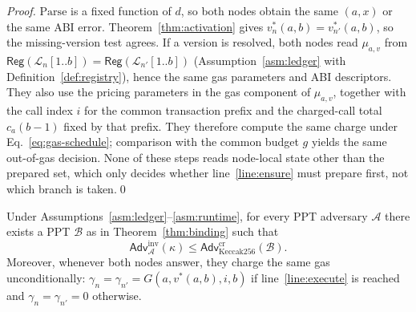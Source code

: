 \documentclass[runningheads]{llncs}
\begin{document}
\begin{proof}
$\mathrm{Parse}$ is a fixed function of $d$, so both nodes obtain the same $(a,x)$ or the same ABI error. Theorem~\ref{thm:activation} gives $v^{*}_{n}(a,b)=v^{*}_{n'}(a,b)$, so the missing-version test agrees. If a version is resolved, both nodes read $\mu_{a,v}$ from $\mathsf{Reg}(\mathcal{L}_n[1..b])=\mathsf{Reg}(\mathcal{L}_{n'}[1..b])$ (Assumption~\ref{asm:ledger} with Definition~\ref{def:registry}), hence the same gas parameters and ABI descriptors. They also use the pricing parameters in the gas component of $\mu_{a,v}$, together with the call index $i$ for the common transaction prefix and the charged-call total $c_{a}(b-1)$ fixed by that prefix. They therefore compute the same charge under Eq.~\eqref{eq:gas-schedule}; comparison with the common budget $g$ yields the same out-of-gas decision. None of these steps reads node-local state other than the prepared set, which only decides whether line~\ref{line:ensure} must prepare first, not which branch is taken.\qed
\end{proof}

\begin{theorem}
\label{thm:invocation}
Under Assumptions~\ref{asm:ledger}--\ref{asm:runtime}, for every PPT adversary $\mathcal{A}$ there exists a PPT $\mathcal{B}$ as in Theorem~\ref{thm:binding} such that
\begin{equation}
\mathsf{Adv}^{\mathrm{inv}}_{\mathcal{A}}(\kappa)\le\mathsf{Adv}^{\mathrm{cr}}_{\mathrm{Keccak256}}(\mathcal{B}).
\label{eq:inv-bound}
\end{equation}
Moreover, whenever both nodes answer, they charge the same gas unconditionally: $\gamma_n=\gamma_{n'}=G(a,v^{*}(a,b),i,b)$ if line~\ref{line:execute} is reached and $\gamma_n=\gamma_{n'}=0$ otherwise.
\end{theorem}
\end{document}
